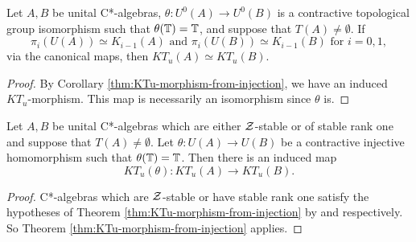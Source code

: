 \documentclass[12pt]{amsart}
\begin{document}
\begin{cor}\label{cor:KTu-isomorphism}
Let $A,B$ be unital C*-algebras, $\theta: U^0(A) \to U^0(B)$ is a contractive topological group isomorphism such that $\theta(\mathbb{T}) = \mathbb{T}$, and suppose that $T(A) \neq \emptyset$.  If 
\begin{equation}
\pi_i(U(A)) \simeq K_{i-1}(A)\text{ and } \pi_i(U(B)) \simeq K_{i-1}(B) \text{ for } i=0,1,
\end{equation}
via the canonical maps, then $KT_u(A) \simeq KT_u(B)$.
\begin{proof}
By Corollary \ref{thm:KTu-morphism-from-injection}, we have an induced $KT_u$-morphism. This map is necessarily an isomorphism since $\theta$ is. 
\end{proof}
\end{cor}

\begin{cor}\label{cor:reg-KT_u-morph}
Let $A,B$ be unital C*-algebras which are either $\mathcal{Z}$-stable or of stable rank one and suppose that $T(A) \neq \emptyset$. Let $\theta: U(A) \to U(B)$ be a contractive injective homomorphism such that $\theta(\mathbb{T}) = \mathbb{T}$. Then there is an induced map
\[ KT_u(\theta): KT_u(A) \to KT_u(B). \]
\begin{proof}
C*-algebras which are $\mathcal{Z}$-stable or have stable rank one satisfy the hypotheses of Theorem \ref{thm:KTu-morphism-from-injection} by \cite{Jiang97} and \cite{Rieffel87} respectively. So Theorem \ref{thm:KTu-morphism-from-injection} applies.
\end{proof}
\end{cor}

\end{document}
